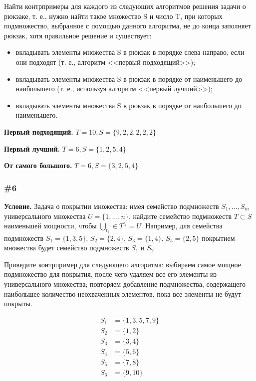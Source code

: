 \documentclass{article}
\begin{document}
Найти контрпримеры для каждого из следующих алгоритмов решения задачи о рюкзаке,
т. е., нужно найти такое множество S и число T, при которых подмножество,
выбранное с помощью данного алгоритма, не до конца заполняет рюкзак,
хотя правильное решение и существует:

\begin{itemize}
    \item вкладывать элементы множества S в рюкзак в порядке слева направо, если они подходят (т. е., алгоритм <<первый подходящий>>);
    \item вкладывать элементы множества S в рюкзак в порядке от наименьшего до наибольшего
          (т. е., используя алгоритм <<первый лучший>>);
    \item вкладывать элементы множества S в рюкзак в порядке от наибольшего до наименьшего.
\end{itemize}

\textbf{Первый подходящий.}
\(T = 10, S = \{9, 2, 2, 2, 2, 2\}\)

\textbf{Первый лучший.}
\(T = 6, S = \{1, 2, 5, 4\}\)

\textbf{От самого большого.}
\(T = 6, S = \{3, 2, 5, 4\}\)

\subsubsection{\#6}

\textbf{Условие.}
Задача о покрытии множества: имея семейство подмножеств \(S_1, \ldots, S_m\) универсального
множества \(U = \{1, \ldots, n\}\), найдите семейство подмножеств \(T \subset S\) 
наименьшей мощности, чтобы \(\bigcup_{t_i} \in T^{t_i} = U\).
Например, для семейства подмножеств \(S_1 = \{1, 3, 5\}\), \(S_2 = \{2, 4\}\), \(S_3 = \{1, 4\}\),
\(S_5 = \{2,5\}\) покрытием множества будет семейство подмножеств \(S_1\) и \(S_2\).

Приведите контрпример для следующего алгоритма: выбираем самое мощное подмножество для покрытия,
после чего удаляем все его элементы из универсального множества; повторяем добавление подмножества,
содержащего наибольшее количество неохваченных элементов, пока все элементы не будут покрыты.

\begin{align}
    S_1 &= \{1, 3, 5, 7, 9\}\\
    S_2 &= \{1, 2\}\\
    S_3 &= \{3, 4\}\\
    S_4 &= \{5, 6\}\\
    S_5 &= \{7, 8\}\\
    S_6 &= \{9, 10\}
\end{align}
\end{document}
